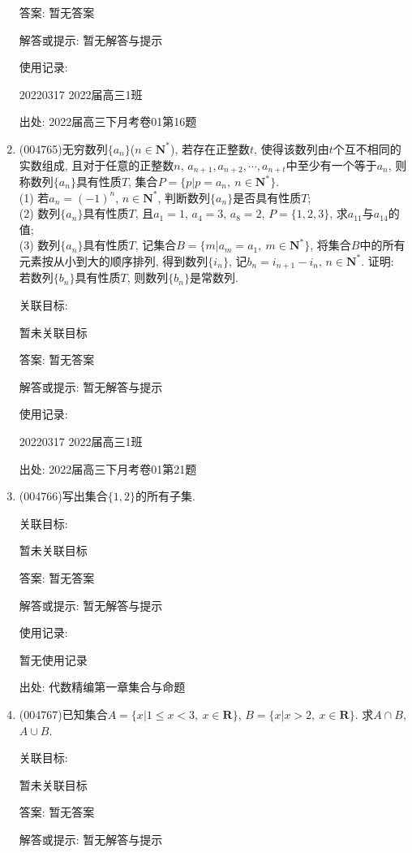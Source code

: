 \documentclass[10pt,a4paper]{article}
\begin{document}
\begin{enumerate}[1.]
答案: 暂无答案

解答或提示: 暂无解答与提示

使用记录:

20220317	2022届高三1班	


出处: 2022届高三下月考卷01第16题
\item { (004765)}无穷数列$\{a_n\}$($n\in \mathbf{N}^*$), 若存在正整数$t$, 使得该数列由$t$个互不相同的实数组成, 且对于任意的正整数$n$, $a_{n+1},a_{n+2},\cdots,a_{n+t}$中至少有一个等于$a_n$, 则称数列$\{a_n\}$具有性质$T$, 集合$P=\{p|p=a_n, \ n\in \mathbf{N}^*\}$.\\
(1) 若$a_n=(-1)^n$, $n\in \mathbf{N}^*$, 判断数列$\{a_n\}$是否具有性质$T$;\\
(2) 数列$\{a_n\}$具有性质$T$, 且$a_1=1$, $a_4=3$, $a_8=2$, $P=\{1,2,3\}$, 求$a_{11}$与$a_{14}$的值;\\
(3) 数列$\{a_n\}$具有性质$T$, 记集合$B=\{m|a_m=a_1, \ m\in \mathbf{N}^*\}$, 将集合$B$中的所有元素按从小到大的顺序排列, 得到数列$\{i_n\}$, 记$b_n=i_{n+1}-i_n$, $n\in \mathbf{N}^*$. 证明: 若数列$\{b_n\}$具有性质$T$, 则数列$\{b_n\}$是常数列.


关联目标:

暂未关联目标

答案: 暂无答案

解答或提示: 暂无解答与提示

使用记录:

20220317	2022届高三1班			


出处: 2022届高三下月考卷01第21题
\item { (004766)}写出集合$\{1,2\}$的所有子集.


关联目标:

暂未关联目标

答案: 暂无答案

解答或提示: 暂无解答与提示

使用记录:

暂无使用记录


出处: 代数精编第一章集合与命题
\item { (004767)}已知集合$A=\{x|1 \le x<3,\ x\in \mathbf{R}\}$, $B=\{x|x>2,\ x\in \mathbf{R}\}$. 求$A\cap B$, $A\cup B$.


关联目标:

暂未关联目标

答案: 暂无答案

解答或提示: 暂无解答与提示


\end{enumerate}
\end{document}
